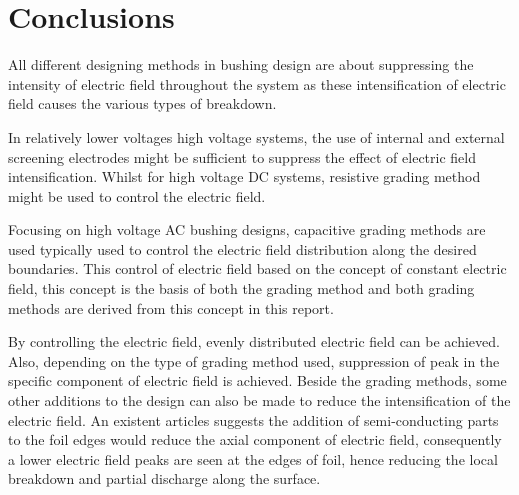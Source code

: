 \section{Conclusions}
All different designing methods in bushing design are about suppressing the intensity of electric field throughout the system as these intensification of electric field causes the various types of breakdown.

 In relatively lower voltages high voltage systems, the use of internal and external screening electrodes might be sufficient to suppress the effect of electric field intensification. Whilst for high voltage DC systems, resistive grading method might be used to control the electric field.

Focusing on high voltage AC bushing designs, capacitive grading methods are used typically used to control the electric field distribution along the desired boundaries. This control of electric field based on the concept of constant electric field, this concept is the basis of both the grading method and both grading methods are derived from this concept in this report.

By controlling the electric field, evenly distributed electric field can be achieved. Also, depending on the type of grading method used, suppression of peak in the specific component of electric field is achieved. Beside the grading methods, some other additions to the design can also be made to reduce the intensification of the electric field. An existent articles suggests the addition of semi-conducting parts to the foil edges would reduce the axial component of electric field, consequently a lower electric field peaks are seen at the edges of foil, hence reducing the local breakdown and partial discharge along the surface.

